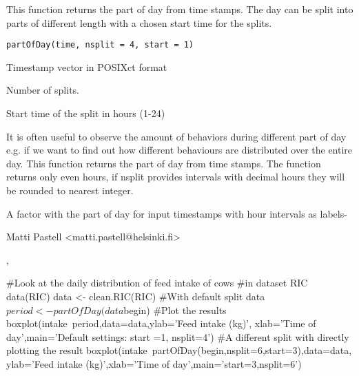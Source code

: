\documentclass{book}
\begin{document}
\begin{Description}\relax
This function returns the part of day
from time stamps. The day can be split into parts of different length
with a chosen start time for the splits.
\end{Description}
\begin{Usage}
\begin{verbatim}
partOfDay(time, nsplit = 4, start = 1)
\end{verbatim}
\end{Usage}
\begin{Arguments}
\begin{ldescription}
\item[\code{time}] Timestamp vector in POSIXct format
\item[\code{nsplit}] Number of splits.
\item[\code{start}] Start time of the split in hours (1-24)
\end{ldescription}
\end{Arguments}
\begin{Details}\relax
It is often useful to observe the amount of behaviors during different
part of day e.g. if we want to find out how different behaviours are
distributed over the entire day. This function returns the part of day
from time stamps. The function returns only even hours, if nsplit
provides intervals with decimal hours they will be rounded to
nearest integer.
\end{Details}
\begin{Value}
A factor with the part of day for input timestamps with hour intervals
as labels-
\end{Value}
\begin{Author}\relax
Matti Pastell <matti.pastell@helsinki.fi>
\end{Author}
\begin{SeeAlso}\relax
{}, 
\end{SeeAlso}
\begin{Examples}
\begin{ExampleCode}
#Look at the daily distribution of feed intake of cows
#in dataset RIC
data(RIC)
data <- clean.RIC(RIC)
#With default split
data$period <- partOfDay(data$begin)
#Plot the results
boxplot(intake~period,data=data,ylab='Feed intake (kg)',
xlab='Time of day',main='Default settings: start =1, nsplit=4')
#A different split with directly plotting the result
boxplot(intake~partOfDay(begin,nsplit=6,start=3),data=data,
ylab='Feed intake (kg)',xlab='Time of day',main='start=3,nsplit=6')
\end{ExampleCode}
\end{Examples}
\end{document}

